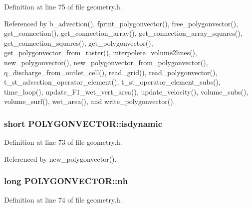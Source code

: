 Definition at line 75 of file geometry.\-h.



Referenced by b\-\_\-advection(), fprint\-\_\-polygonvector(), free\-\_\-polygonvector(), get\-\_\-connection(), get\-\_\-connection\-\_\-array(), get\-\_\-connection\-\_\-array\-\_\-squares(), get\-\_\-connection\-\_\-squares(), get\-\_\-polygonvector(), get\-\_\-polygonvector\-\_\-from\-\_\-raster(), interpolete\-\_\-volume2lines(), new\-\_\-polygonvector(), new\-\_\-polygonvector\-\_\-from\-\_\-polygonvector(), q\-\_\-discharge\-\_\-from\-\_\-outlet\-\_\-cell(), read\-\_\-grid(), read\-\_\-polygonvector(), t\-\_\-st\-\_\-advection\-\_\-operator\-\_\-element(), t\-\_\-st\-\_\-operator\-\_\-element\-\_\-subs(), time\-\_\-loop(), update\-\_\-\-F1\-\_\-wet\-\_\-vert\-\_\-area(), update\-\_\-velocity(), volume\-\_\-subs(), volume\-\_\-surf(), wet\-\_\-area(), and write\-\_\-polygonvector().

\hypertarget{struct_p_o_l_y_g_o_n_v_e_c_t_o_r_a842dd05298147797db035306ce3c2424}{
\subsubsection[{isdynamic}]{\setlength{\rightskip}{0pt plus 5cm}short P\-O\-L\-Y\-G\-O\-N\-V\-E\-C\-T\-O\-R\-::isdynamic}}\label{struct_p_o_l_y_g_o_n_v_e_c_t_o_r_a842dd05298147797db035306ce3c2424}


Definition at line 73 of file geometry.\-h.



Referenced by new\-\_\-polygonvector().

\hypertarget{struct_p_o_l_y_g_o_n_v_e_c_t_o_r_a13be69b5d64ab9b144901f202d9b0eb9}{
\subsubsection[{nh}]{\setlength{\rightskip}{0pt plus 5cm}long P\-O\-L\-Y\-G\-O\-N\-V\-E\-C\-T\-O\-R\-::nh}}\label{struct_p_o_l_y_g_o_n_v_e_c_t_o_r_a13be69b5d64ab9b144901f202d9b0eb9}


Definition at line 74 of file geometry.\-h.



